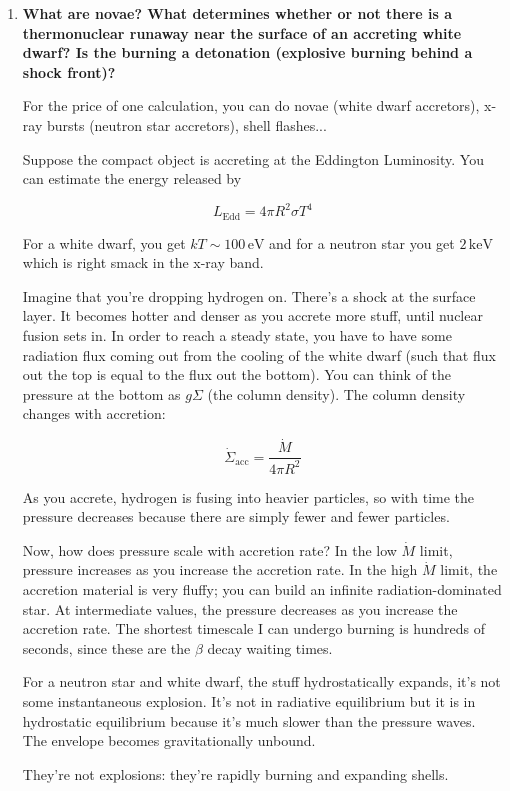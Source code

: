 \documentclass[a4paper]{article}
\newcommand{\ledd}{L_{\mathrm{Edd}}}
\begin{document}
\begin{enumerate}
\item \textbf{What are novae? What determines whether or not there is a thermonuclear runaway near the surface of an accreting white dwarf? Is the burning a detonation (explosive burning behind
a shock front)?}

For the price of one calculation, you can do novae (white dwarf accretors), x-ray bursts (neutron star accretors), shell flashes...

Suppose the compact object is accreting at the Eddington Luminosity. You can estimate the energy released by

$$ \ledd = 4 \pi R^2 \sigma T^4 $$

For a white dwarf, you get $kT \sim 100\,\mathrm{eV}$ and for a neutron star you get $2\,\mathrm{keV}$ which is right smack in the x-ray band.

Imagine that you're dropping hydrogen on. There's a shock at the surface layer. It becomes hotter and denser as you accrete more stuff, until nuclear fusion sets in. In order to reach a steady state, you have to have some radiation flux coming out from the cooling of the white dwarf (such that flux out the top is equal to the flux out the bottom). You can think of the pressure at the bottom as $g \Sigma$ (the column density). The column density changes with accretion:

$$ \dot{\Sigma}_\mathrm{acc} = \frac{\dot{M}}{4 \pi R^2} $$

As you accrete, hydrogen is fusing into heavier particles, so with time the pressure decreases because there are simply fewer and fewer particles.

Now, how does pressure scale with accretion rate? 
In the low $\dot{M}$ limit, pressure increases as you increase the accretion rate. In the high $\dot{M}$ limit, the accretion material is very fluffy; you can build an infinite radiation-dominated star. 
At intermediate values, the pressure decreases as you increase the accretion rate. 
The shortest timescale I can undergo burning is hundreds of seconds, since these are the $\beta$ decay waiting times. 

For a neutron star and white dwarf, the stuff hydrostatically expands, it's not some instantaneous explosion. It's not in radiative equilibrium but it is in hydrostatic equilibrium because it's much slower than the pressure waves. The envelope becomes gravitationally unbound. 

They're not explosions: they're rapidly burning and expanding shells.


\end{enumerate}
\end{document}
